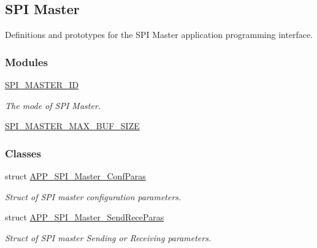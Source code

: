 \hypertarget{group___s_p_i___m_a_s_t_e_r}{}\subsection{S\+PI Master}
\label{group___s_p_i___m_a_s_t_e_r}


Definitions and prototypes for the S\+PI Master application programming interface.  


\subsubsection*{Modules}
\begin{DoxyCompactItemize}
\item 
\hyperlink{group___s_p_i___m_a_s_t_e_r___i_d}{S\+P\+I\+\_\+\+M\+A\+S\+T\+E\+R\+\_\+\+ID}
\begin{DoxyCompactList}\small\item\em The mode of S\+PI Master. \end{DoxyCompactList}\item 
\hyperlink{group___s_p_i___m_a_s_t_e_r___m_a_x___b_u_f___s_i_z_e}{S\+P\+I\+\_\+\+M\+A\+S\+T\+E\+R\+\_\+\+M\+A\+X\+\_\+\+B\+U\+F\+\_\+\+S\+I\+ZE}
\end{DoxyCompactItemize}
\subsubsection*{Classes}
\begin{DoxyCompactItemize}
\item 
struct \hyperlink{struct_a_p_p___s_p_i___master___conf_paras}{A\+P\+P\+\_\+\+S\+P\+I\+\_\+\+Master\+\_\+\+Conf\+Paras}
\begin{DoxyCompactList}\small\item\em Struct of S\+PI master configuration parameters. \end{DoxyCompactList}\item 
struct \hyperlink{struct_a_p_p___s_p_i___master___send_rece_paras}{A\+P\+P\+\_\+\+S\+P\+I\+\_\+\+Master\+\_\+\+Send\+Rece\+Paras}
\begin{DoxyCompactList}\small\item\em Struct of S\+PI master Sending or Receiving parameters. \end{DoxyCompactList}\end{DoxyCompactItemize}
